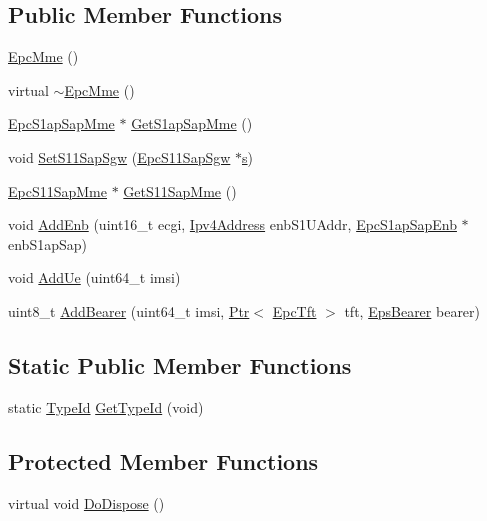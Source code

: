 \subsection*{Public Member Functions}
\begin{DoxyCompactItemize}
\item 
\hyperlink{classns3_1_1EpcMme_a8c1890abf220c8efb991d7c818c35643}{Epc\+Mme} ()
\item 
virtual \hyperlink{classns3_1_1EpcMme_a5650cac953746ad7049f2e836b62b565}{$\sim$\+Epc\+Mme} ()
\item 
\hyperlink{classns3_1_1EpcS1apSapMme}{Epc\+S1ap\+Sap\+Mme} $\ast$ \hyperlink{classns3_1_1EpcMme_ae379e0bd8fadfe496b2924ed9e708c81}{Get\+S1ap\+Sap\+Mme} ()
\item 
void \hyperlink{classns3_1_1EpcMme_a7f630013572d55571cf72beeeeb16202}{Set\+S11\+Sap\+Sgw} (\hyperlink{classns3_1_1EpcS11SapSgw}{Epc\+S11\+Sap\+Sgw} $\ast$\hyperlink{generate__test__data__lte__sinr_8m_ad83eeb3a142285d1243a08c6b7026df8}{s})
\item 
\hyperlink{classns3_1_1EpcS11SapMme}{Epc\+S11\+Sap\+Mme} $\ast$ \hyperlink{classns3_1_1EpcMme_ad59508d863570cb63503666bf86c02b3}{Get\+S11\+Sap\+Mme} ()
\item 
void \hyperlink{classns3_1_1EpcMme_a5ef5984b0eef10eb95b0673a9a26116a}{Add\+Enb} (uint16\+\_\+t ecgi, \hyperlink{classns3_1_1Ipv4Address}{Ipv4\+Address} enb\+S1\+U\+Addr, \hyperlink{classns3_1_1EpcS1apSapEnb}{Epc\+S1ap\+Sap\+Enb} $\ast$enb\+S1ap\+Sap)
\item 
void \hyperlink{classns3_1_1EpcMme_a20b2e38fc1732792d4224263b0d6b55c}{Add\+Ue} (uint64\+\_\+t imsi)
\item 
uint8\+\_\+t \hyperlink{classns3_1_1EpcMme_a1ddc5213e5ab0c68bc4b24e8bd574f30}{Add\+Bearer} (uint64\+\_\+t imsi, \hyperlink{classns3_1_1Ptr}{Ptr}$<$ \hyperlink{classns3_1_1EpcTft}{Epc\+Tft} $>$ tft, \hyperlink{structns3_1_1EpsBearer}{Eps\+Bearer} bearer)
\end{DoxyCompactItemize}
\subsection*{Static Public Member Functions}
\begin{DoxyCompactItemize}
\item 
static \hyperlink{classns3_1_1TypeId}{Type\+Id} \hyperlink{classns3_1_1EpcMme_a859e645689c74bf8ba9851bf6e130a87}{Get\+Type\+Id} (void)
\end{DoxyCompactItemize}
\subsection*{Protected Member Functions}
\begin{DoxyCompactItemize}
\item 
virtual void \hyperlink{classns3_1_1EpcMme_a0b6f8779b4043f347bd8d363ecea1fbc}{Do\+Dispose} ()
\end{DoxyCompactItemize}
